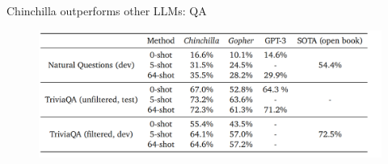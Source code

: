 
\begin{vbframe}{Chinchilla outperforms other LLMs: QA}

\vfill

\begin{figure}
	\centering
	\includegraphics[width = 12cm]{./figure/chinchilla_qa.png} \\ 
\end{figure}

\vfill

\end{vbframe}


\endlecture


